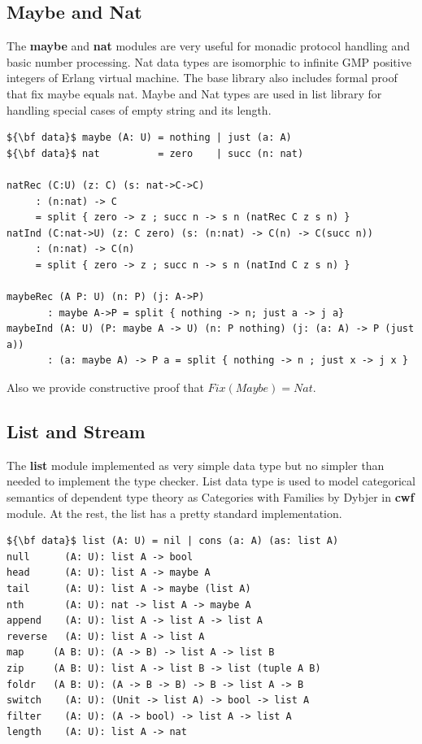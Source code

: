 \documentclass{article}
\begin{document}
\subsection{Maybe and Nat}

The {\bf maybe} and {\bf nat} modules are very useful for monadic protocol handling
and basic number processing. Nat data types are isomorphic
to infinite GMP positive integers of Erlang virtual machine.
The base library also includes formal proof that fix maybe equals nat.
Maybe and Nat types are used in list library for handling special cases
of empty string and its length.

\begin{lstlisting}[mathescape=true]
${\bf data}$ maybe (A: U) = nothing | just (a: A)
${\bf data}$ nat          = zero    | succ (n: nat)

natRec (C:U) (z: C) (s: nat->C->C)
     : (n:nat) -> C
     = split { zero -> z ; succ n -> s n (natRec C z s n) }
natInd (C:nat->U) (z: C zero) (s: (n:nat) -> C(n) -> C(succ n))
     : (n:nat) -> C(n)
     = split { zero -> z ; succ n -> s n (natInd C z s n) }

maybeRec (A P: U) (n: P) (j: A->P)
       : maybe A->P = split { nothing -> n; just a -> j a}
maybeInd (A: U) (P: maybe A -> U) (n: P nothing) (j: (a: A) -> P (just a))
       : (a: maybe A) -> P a = split { nothing -> n ; just x -> j x }
\end{lstlisting}

Also we provide constructive proof that $Fix(Maybe) = Nat$.

\subsection{List and Stream}

The {\bf list} module implemented as very simple data type but no simpler
than needed to implement the type checker. List data type is
used to model categorical semantics of dependent type theory
as Categories with Families by Dybjer in {\bf cwf} module.
At the rest, the list has a pretty standard implementation.

\begin{lstlisting}[mathescape=true]
${\bf data}$ list (A: U) = nil | cons (a: A) (as: list A)
null      (A: U): list A -> bool
head      (A: U): list A -> maybe A
tail      (A: U): list A -> maybe (list A)
nth       (A: U): nat -> list A -> maybe A
append    (A: U): list A -> list A -> list A
reverse   (A: U): list A -> list A
map     (A B: U): (A -> B) -> list A -> list B
zip     (A B: U): list A -> list B -> list (tuple A B)
foldr   (A B: U): (A -> B -> B) -> B -> list A -> B
switch    (A: U): (Unit -> list A) -> bool -> list A
filter    (A: U): (A -> bool) -> list A -> list A
length    (A: U): list A -> nat
\end{lstlisting}
\end{document}
